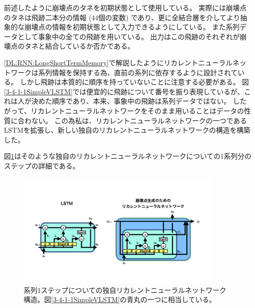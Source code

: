 前述したように崩壊点のタネを初期状態として使用している。
実際には崩壊点のタネは飛跡二本分の情報 ($44$個の変数) であり、更に全結合層を介してより抽象的な崩壊点の情報を初期状態として入力できるようにしている。
また系列データとして事象中の全ての飛跡を用いている。
出力はこの飛跡のそれぞれが崩壊点のタネと結合しているか否かである。

\ref{DL:RNN:LongShortTermMemory}で解説したようにリカレントニューラルネットワークは系列情報を保持する為、直前の系列に依存するように設計されている。
しかし飛跡は本質的に順序を持っていないことに注意する必要がある。
図\ref{3-4-1-1SimpleVLSTM}では便宜的に飛跡について番号を振り表現しているが、これは人が決めた順序であり、本来、事象中の飛跡は系列データではない。
したがって、リカレントニューラルネットワークをそのまま用いることはデータの性質に合わない。
この為私は、リカレントニューラルネットワークの一つであるLSTMを拡張し、新しい独自のリカレントニューラルネットワークの構造を構築した。

図\ref{3-4-1-2VLSTMStructure}はそのような独自のリカレントニューラルネットワークについての1系列分のステップの詳細である。

\begin{figure}[htbp]
 \centering
 \includegraphics[trim = 0 100 0 200, width=0.9\textwidth, clip]{Figure/3Networks/3-4-1-2VLSTMStructure.png}
 \caption[系列1ステップについての独自リカレントニューラルネットワーク構造]{系列1ステップについての独自リカレントニューラルネットワーク構造。図\ref{3-4-1-1SimpleVLSTM}の青丸の一つに相当している。}
 \label{3-4-1-2VLSTMStructure}
\end{figure}

